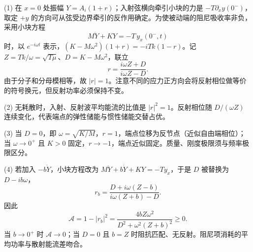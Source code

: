 (1) 在 \(x=0\) 处振幅 \(Y=A_i(1+r)\)；入射弦横向牵引小块的力是 \(-T\partial_x y(0^-)\)，取定 \(+y\) 的方向可从弦受边界牵引的反作用确定。为使被动端的阻尼吸收率非负，采用小块方程
\[
M\ddot Y+KY=-T\,y_x(0^-,t)
\]
时，以 \(e^{-i\omega t}\) 表示，\( (K-M\omega^2)(1+r)=-iT k(1-r)\)。记 \(Z=Tk/\omega=\sqrt{T\mu}\)、\(D=K-M\omega^2\)，联立
\[
r=\frac{i\omega Z+D}{i\omega Z-D}.
\]
由于分子和分母模相等，故 \(|r|=1\)。注意不同的应力正方向会将反射相位做等价的符号换元，但反射功率必须保持不变。

(2) 无耗散时，入射、反射波平均能流的比值是 \(|r|^2=1\)。反射相位随 \(D/(\omega Z)\) 连续变化，代表端点的弹性储能与惯性储能交替占优。

(3) 当 \(D=0\)，即 \(\omega=\sqrt{K/M}\)，\(r=1\)，端点位移为反节点（近似自由端相位）；当 \(\omega\to0^+\) 且 \(K>0\) 固定，\(r\to-1\)，端点近似固定。质量、刚度极限须与频率极限区分。

(4) 若加入 \(-b\dot Y\)，小块方程改为 \(M\ddot Y+b\dot Y+KY=-T y_x\)，于是 \(D\) 被替换为 \(D-i b\omega\)，
\[
r_b=\frac{D+i\omega(Z-b)}{i\omega(Z+b)-D}.
\]
因此
\[
\mathcal A=1-|r_b|^2=\frac{4bZ\omega^2}{D^2+\omega^2(Z+b)^2}\ge0.
\]
当 \(b\to0^+\) 时 \(\mathcal A\to0\)；当 \(D=0\) 且 \(b=Z\) 时阻抗匹配、无反射。阻尼项消耗的平均功率与散射能流差吻合。
